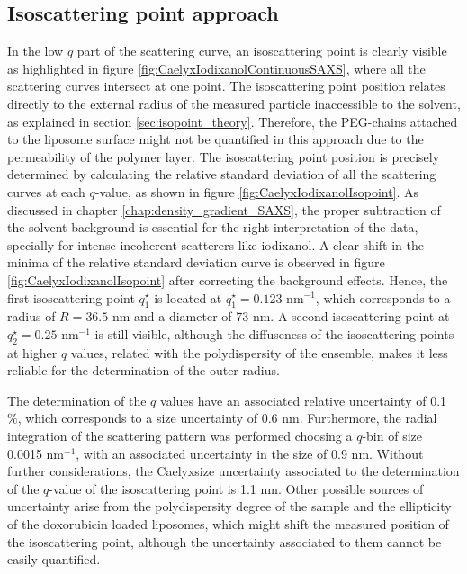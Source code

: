 \subsection{Isoscattering point approach}
In the low $q$ part of the scattering curve, an isoscattering point is clearly visible as highlighted in figure \ref{fig:CaelyxIodixanolContinuousSAXS}, where all the scattering curves intersect at one point. The isoscattering point position relates directly to the external radius of the measured particle inaccessible to the solvent, as explained in section \ref{sec:isopoint_theory}. Therefore, the PEG-chains attached to the liposome surface might not be quantified in this approach due to the permeability of the polymer layer. The isoscattering point position is precisely determined by calculating the relative standard deviation of all the scattering curves at each $q$-value, as shown in figure \ref{fig:CaelyxIodixanolIsopoint}. As discussed in chapter \ref{chap:density_gradient_SAXS}, the proper subtraction of the solvent background is essential for the right interpretation of the data, specially for intense incoherent scatterers like iodixanol. A clear shift in the minima of the relative standard deviation curve is observed in figure \ref{fig:CaelyxIodixanolIsopoint} after correcting the background effects. Hence, the first isoscattering point $q^{\star}_1$ is located at $q^{\star}_1 = 0.123$ nm$^{-1}$, which corresponds to a radius of $R = 36.5$ nm and a diameter of 73 nm. A second isoscattering point at $q^{\star}_2 = 0.25$ nm$^{-1}$ is still visible, although the diffuseness of the isoscattering points at higher $q$ values, related with the polydispersity of the ensemble, makes it less reliable for the determination of the outer radius.

The determination of the $q$ values have an associated relative uncertainty of 0.1 $\%$, which corresponds to a size uncertainty of 0.6 nm. Furthermore, the radial integration of the scattering pattern was performed choosing a $q$-bin of size 0.0015 nm$^{-1}$, with an associated uncertainty in the size of 0.9 nm. Without further considerations, the Caelyx\textregistered size uncertainty associated to the determination of the $q$-value of the isoscattering point is 1.1 nm. Other possible sources of uncertainty arise from the polydispersity degree of the sample and the ellipticity of the doxorubicin loaded liposomes, which might shift the measured position of the isoscattering point, although the uncertainty associated to them cannot be easily quantified. 

